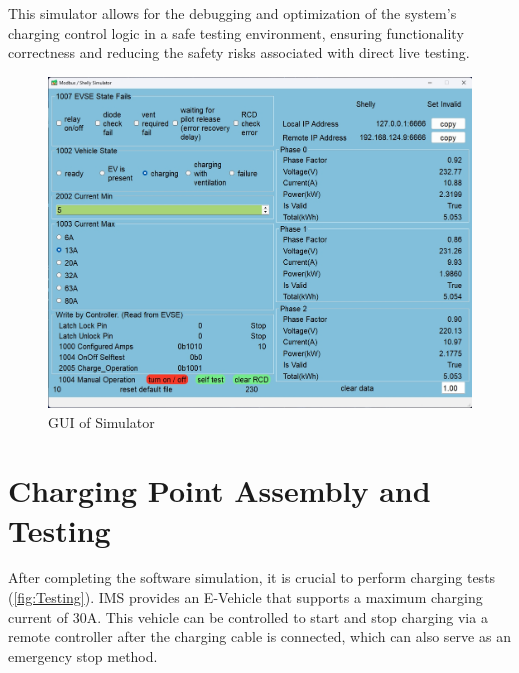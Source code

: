 \documentclass[
	english,
	ruledheaders=section,%
	class=report,%
	thesis={type=Report},%
	accentcolor=9c,%
	custommargins=true,%
	marginpar=false,%
	parskip=half-,%
	fontsize=11pt,%
	logofile={img/tuda_logo.pdf}, %
]{tudapub}
\begin{document}
This simulator allows for the debugging and optimization of the system's charging control logic in a safe testing environment, ensuring functionality correctness and reducing the safety risks associated with direct live testing.
\begin{figure}[H]
    \centering
    \includegraphics[width=0.5\linewidth]{img/Simulator.png}
    \caption{GUI of Simulator}
    \label{fig:Simulator}
\end{figure}


\section{Charging Point Assembly and Testing}
\label{sec:assembleAndTest}


After completing the software simulation, it is crucial to perform charging tests (\autoref{fig:Testing}). IMS provides an E-Vehicle that supports a maximum charging current of 30A. This vehicle can be controlled to start and stop charging via a remote controller after the charging cable is connected, which can also serve as an emergency stop method.
\end{document}
